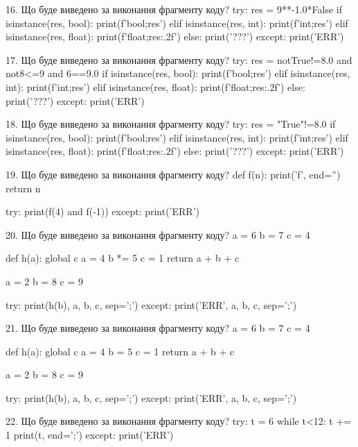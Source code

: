 \documentclass[11pt]{article}
\begin{document}

16. Що буде виведено за виконання фрагменту коду?
try:
    res = 9**-1.0*False
    if isinstance(res, bool):
        print(f'bool;{res}')
    elif isinstance(res, int):
        print(f'int;{res}')
    elif isinstance(res, float):
        print(f'float;{res:.2f}')
    else:
        print('???')
except:
    print('ERR')


17. Що буде виведено за виконання фрагменту коду?
try:
    res = notTrue!=8.0 and not8<=9 and 6==9.0
    if isinstance(res, bool):
        print(f'bool;{res}')
    elif isinstance(res, int):
        print(f'int;{res}')
    elif isinstance(res, float):
        print(f'float;{res:.2f}')
    else:
        print('???')
except:
    print('ERR')


18. Що буде виведено за виконання фрагменту коду?
try:
    res = "True"!=8.0
    if isinstance(res, bool):
        print(f'bool;{res}')
    elif isinstance(res, int):
        print(f'int;{res}')
    elif isinstance(res, float):
        print(f'float;{res:.2f}')
    else:
        print('???')
except:
    print('ERR')


19. Що буде виведено за виконання фрагменту коду?
def f(n):
    print('f', end='')
    return n

try:
    print(f(4) and f(-1))
except:
    print('ERR')


20. Що буде виведено за виконання фрагменту коду?
a = 6
b = 7
c = 4

def h(a):
global c    a = 4
    b *= 5
    c = 1
    return a + b + c

a = 2
b = 8
c = 9

try:
    print(h(b), a, b, c, sep=';')
except:
    print('ERR', a, b, c, sep=';')


21. Що буде виведено за виконання фрагменту коду?
a = 6
b = 7
c = 4

def h(a):
global c    a = 4
    b = 5
    c = 1
    return a + b + c

a = 2
b = 8
c = 9

try:
    print(h(b), a, b, c, sep=';')
except:
    print('ERR', a, b, c, sep=';')


22. Що буде виведено за виконання фрагменту коду?
try:
    t = 6
    while t<12:
        t += 1
    print(t, end=';')
except:
    print('ERR')
\end{document}
